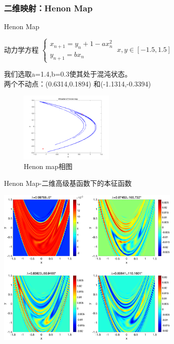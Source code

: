 \documentclass{beamer}
\begin{document}
	\subsubsection{二维映射：Henon Map}
		\begin{frame}{Henon Map}
		\begin{block}{动力学方程}
			\centering
			\begin{math}
			\begin{cases}
				x_{n+1}=y_n+1-ax_n^2\\
				y_{n+1}=bx_n
			\end{cases}\ x,y\in [-1.5,1.5]
			\end{math}
		\end{block}
		我们选取a=1.4,b=0.3使其处于混沌状态。\\
		两个不动点：(0.6314,0.1894)
和(-1.1314,-0.3394)
		\begin{figure}
			\begin{minipage}{0.4\linewidth}
				\centering
				\includegraphics[width=1.8in]{figure/henon_phase}
				\caption{Henon map相图}
			\end{minipage}
		\end{figure}
		\end{frame}
	\begin{frame}{Henon Map-二维高级基函数下的本征函数}
		\centerline{\includegraphics[width=3.5in]{images/09-Henon_eigen_Gauss_n100m50md45.eps}}
	\end{frame}
\end{document}
